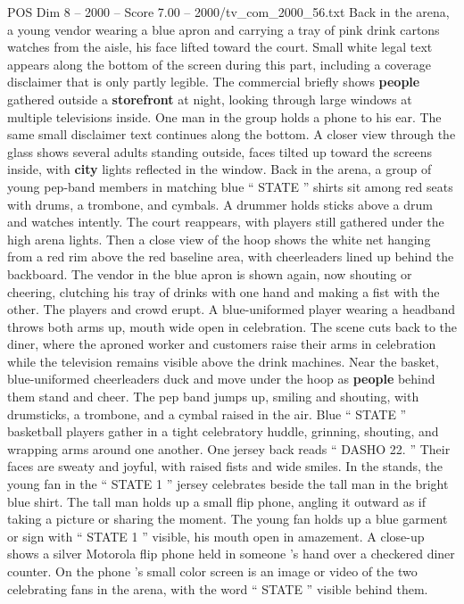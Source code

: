 \begin{textsample}{POS Dim 8 – 2000 – Score 7.00 – 2000/tv\_com\_2000\_56.txt}
Back in the arena, a young vendor wearing a blue apron and carrying a tray of pink drink cartons watches from the aisle, his face lifted toward the court.
Small white legal text appears along the bottom of the screen during this part, including a coverage disclaimer that is only partly legible.
The commercial briefly shows \textbf{people} gathered outside a \textbf{storefront} at night, looking through large windows at multiple televisions inside.
One man in the group holds a phone to his ear.
The same small disclaimer text continues along the bottom.
A closer view through the glass shows several adults standing outside, faces tilted up toward the screens inside, with \textbf{city} lights reflected in the window.
Back in the arena, a group of young pep-band members in matching blue “ STATE ” shirts sit among red seats with drums, a trombone, and cymbals.
A drummer holds sticks above a drum and watches intently.
The court reappears, with players still gathered under the high arena lights.
Then a close view of the hoop shows the white net hanging from a red rim above the red baseline area, with cheerleaders lined up behind the backboard.
The vendor in the blue apron is shown again, now shouting or cheering, clutching his tray of drinks with one hand and making a fist with the other.
The players and crowd erupt.
A blue-uniformed player wearing a headband throws both arms up, mouth wide open in celebration.
The scene cuts back to the diner, where the aproned worker and customers raise their arms in celebration while the television remains visible above the drink machines.
Near the basket, blue-uniformed cheerleaders duck and move under the hoop as \textbf{people} behind them stand and cheer.
The pep band jumps up, smiling and shouting, with drumsticks, a trombone, and a cymbal raised in the air.
Blue “ STATE ” basketball players gather in a tight celebratory huddle, grinning, shouting, and wrapping arms around one another.
One jersey back reads “ DASHO 22. ” Their faces are sweaty and joyful, with raised fists and wide smiles.
In the stands, the young fan in the “ STATE 1 ” jersey celebrates beside the tall man in the bright blue shirt.
The tall man holds up a small flip phone, angling it outward as if taking a picture or sharing the moment.
The young fan holds up a blue garment or sign with “ STATE 1 ” visible, his mouth open in amazement.
A close-up shows a silver Motorola flip phone held in someone ’s hand over a checkered diner counter.
On the phone ’s small color screen is an image or video of the two celebrating fans in the arena, with the word “ STATE ” visible behind them.

\end{textsample}
